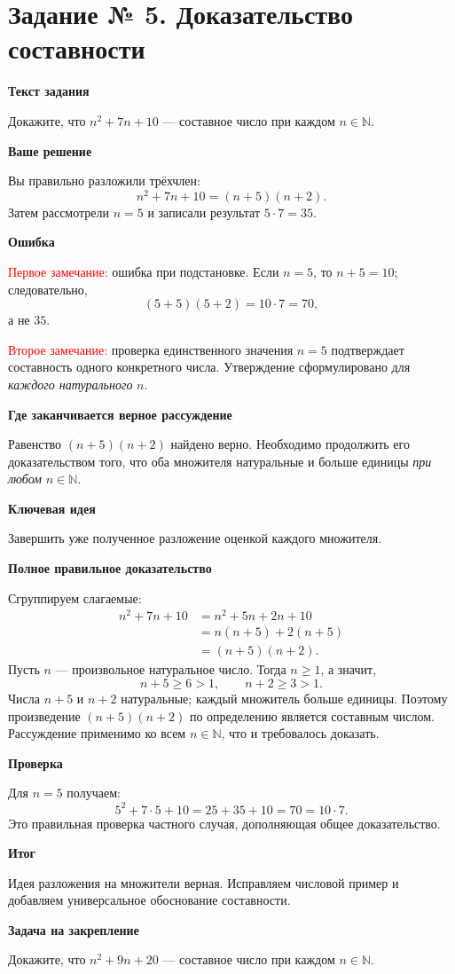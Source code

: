 \documentclass[12pt,a4paper]{article}
\newcommand{\parthead}[1]{\par\medskip\textbf{#1}\par\smallskip}
\begin{document}
\clearpage
{}\label{task:5}
\section*{Задание № 5. Доказательство составности}
\parthead{Текст задания}
Докажите, что $n^2+7n+10$ --- составное число при каждом $n\in\mathbb N$.

\parthead{Ваше решение}
Вы правильно разложили трёхчлен:
\[
n^2+7n+10=(n+5)(n+2).
\]
Затем рассмотрели $n=5$ и записали результат $5\cdot7=35$.

\parthead{Ошибка}
\textcolor{red}{Первое замечание:} ошибка при подстановке. Если $n=5$, то $n+5=10$; следовательно,
\[
(5+5)(5+2)=10\cdot7=70,
\]
а не $35$.

\textcolor{red}{Второе замечание:} проверка единственного значения $n=5$ подтверждает составность одного конкретного числа. Утверждение сформулировано для \emph{каждого натурального} $n$.

\parthead{Где заканчивается верное рассуждение}
Равенство $(n+5)(n+2)$ найдено верно. Необходимо продолжить его доказательством того, что оба множителя натуральные и больше единицы \emph{при любом} $n\in\mathbb N$.

\parthead{\textcolor{blue!60!black}{Ключевая идея}}
Завершить уже полученное разложение оценкой каждого множителя.

\parthead{Полное правильное доказательство}
Сгруппируем слагаемые:
\[
\begin{aligned}
n^2+7n+10
&=n^2+5n+2n+10\\
&=n(n+5)+2(n+5)\\
&=(n+5)(n+2).
\end{aligned}
\]
Пусть $n$ --- произвольное натуральное число. Тогда $n\ge1$, а значит,
\[
n+5\ge6>1,\qquad n+2\ge3>1.
\]
Числа $n+5$ и $n+2$ натуральные; каждый множитель больше единицы. Поэтому произведение $(n+5)(n+2)$ по определению является составным числом. Рассуждение применимо ко всем $n\in\mathbb N$, что и требовалось доказать.

\parthead{Проверка}
Для $n=5$ получаем:
\[
5^2+7\cdot5+10=25+35+10=70=10\cdot7.
\]
Это правильная проверка частного случая, дополняющая общее доказательство.

\parthead{\textcolor{teal!60!black}{Итог}}
Идея разложения на множители верная. Исправляем числовой пример и добавляем универсальное обоснование составности.

\parthead{Задача на закрепление}
Докажите, что $n^2+9n+20$ --- составное число при каждом $n\in\mathbb N$.
\end{document}
